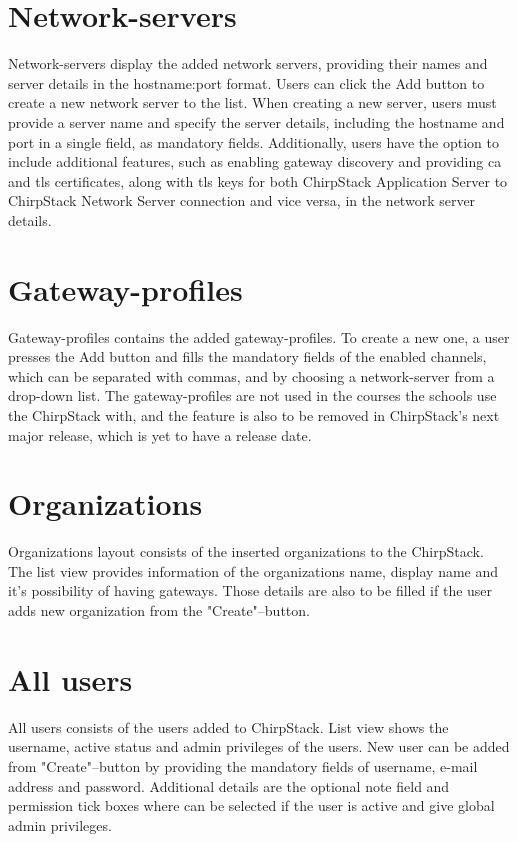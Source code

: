 \section{Network-servers}
Network-servers display the added network servers, providing their names and server details in the hostname:port format.
Users can click the Add button to create a new network server to the list.
When creating a new server, users must provide a server name and specify the server details, including the hostname and port in a single field, as mandatory fields.
Additionally, users have the option to include additional features, such as enabling gateway discovery and providing \gls{ca} and \gls{tls} certificates, along with \gls{tls} keys for both ChirpStack Application Server to ChirpStack Network Server connection and vice versa, in the network server details.

\section{Gateway-profiles}
Gateway-profiles contains the added gateway-profiles.
To create a new one, a user presses the Add button and fills the mandatory fields of the enabled channels, which can be separated with commas, and by choosing a network-server from a drop-down list.
The gateway-profiles are not used in the courses the schools use the ChirpStack with, and the feature is also to be removed in ChirpStack's next major release, which is yet to have a release date.

\section{Organizations}
Organizations layout consists of the inserted organizations to the ChirpStack.
The list view provides information of the organizations name, display name and it's possibility of having gateways.
Those details are also to be filled if the user adds new organization from the "Create"--button.

\section{All users}
All users consists of the users added to ChirpStack.
List view shows the username, active status and admin privileges of the users.
New user can be added from "Create"--button by providing the mandatory fields of username, e-mail address and password. Additional details are the optional note field and permission tick boxes where can be selected if the user is active and give global admin privileges.

